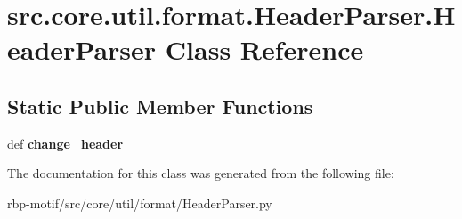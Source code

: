 \hypertarget{classsrc_1_1core_1_1util_1_1format_1_1HeaderParser_1_1HeaderParser}{\section{src.\-core.\-util.\-format.\-Header\-Parser.\-Header\-Parser Class Reference}
\label{classsrc_1_1core_1_1util_1_1format_1_1HeaderParser_1_1HeaderParser}
}
\subsection*{Static Public Member Functions}
\begin{DoxyCompactItemize}
\item 
\hypertarget{classsrc_1_1core_1_1util_1_1format_1_1HeaderParser_1_1HeaderParser_a6c41c1ac672a1ae535fdd00ec450bdc7}{def {\bfseries change\-\_\-header}}\label{classsrc_1_1core_1_1util_1_1format_1_1HeaderParser_1_1HeaderParser_a6c41c1ac672a1ae535fdd00ec450bdc7}

\end{DoxyCompactItemize}


The documentation for this class was generated from the following file\-:\begin{DoxyCompactItemize}
\item 
rbp-\/motif/src/core/util/format/Header\-Parser.\-py\end{DoxyCompactItemize}
